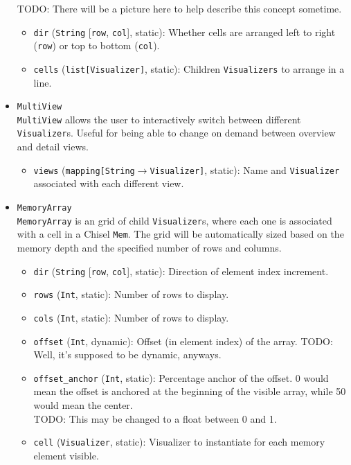 \documentclass[11pt]{article}
\begin{document}
\begin{itemize}
  TODO: There will be a picture here to help describe this concept sometime.
  \begin{itemize}
    \item \texttt{dir} (\texttt{String} [\texttt{row}, \texttt{col}], static): Whether cells are arranged left to right (\texttt{row}) or top to bottom (\texttt{col}).
    \item \texttt{cells} (\texttt{list[Visualizer]}, static): Children \texttt{Visualizers} to arrange in a line.
  \end{itemize}  
  \item \texttt{MultiView} \\
  \texttt{MultiView} allows the user to interactively switch between different \texttt{Visualizer}s. Useful for being able to change on demand between overview and detail views.
  \begin{itemize}
    \item \texttt{views} (\texttt{mapping[String$\rightarrow$Visualizer]}, static): Name and \texttt{Visualizer} associated with each different view.
  \end{itemize}
  \item \texttt{MemoryArray} \\
  \texttt{MemoryArray} is an grid of child \texttt{Visualizer}s, where each one is associated with a cell in a Chisel \texttt{Mem}. The grid will be automatically sized based on the memory depth and the specified number of rows and columns.
  \begin{itemize}
    \item \texttt{dir} (\texttt{String} [\texttt{row}, \texttt{col}], static): Direction of element index increment.
    \item \texttt{rows} (\texttt{Int}, static): Number of rows to display.
    \item \texttt{cols} (\texttt{Int}, static): Number of rows to display.
    \item \texttt{offset} (\texttt{Int}, dynamic): Offset (in element index) of the array. TODO: Well, it's supposed to be dynamic, anyways.
    \item \texttt{offset\_anchor} (\texttt{Int}, static): Percentage anchor of the offset. 0 would mean the offset is anchored at the beginning of the visible array, while 50 would mean the center. \\ TODO: This may be changed to a float between 0 and 1.
    \item \texttt{cell} (\texttt{Visualizer}, static): Visualizer to instantiate for each memory element visible.
  \end{itemize}
\end{itemize}
\end{document}
